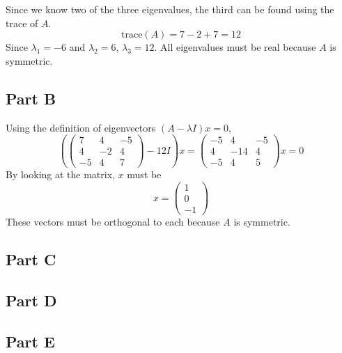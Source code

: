 \documentclass{article}
\begin{document}
Since we know two of the three eigenvalues, the third can be found using the
trace of $A$.
$$ \mathrm{trace}(A) = 7 - 2 + 7 = 12 $$
Since $\lambda_1 = -6$ and $\lambda_2 = 6$, $\lambda_3 = 12$. All eigenvalues
must be real because $A$ is symmetric.

\subsection*{Part B}

Using the definition of eigenvectors $(A - \lambda I) x = 0$,
$$ \left(\begin{pmatrix}
  7 & 4 & -5 \\
  4 & -2 & 4 \\
  -5 & 4 & 7
\end{pmatrix} - 12 I\right) x = \begin{pmatrix}
  -5 & 4 & -5 \\
  4 & -14 & 4 \\
  -5 & 4 & 5
\end{pmatrix} x = 0 $$
By looking at the matrix, $x$ must be
$$ x = \begin{pmatrix}
  1 \\
  0 \\
  -1
\end{pmatrix} $$
These vectors must be orthogonal to each because $A$ is symmetric.

\subsection*{Part C}

\subsection*{Part D}

\subsection*{Part E}
\end{document}
